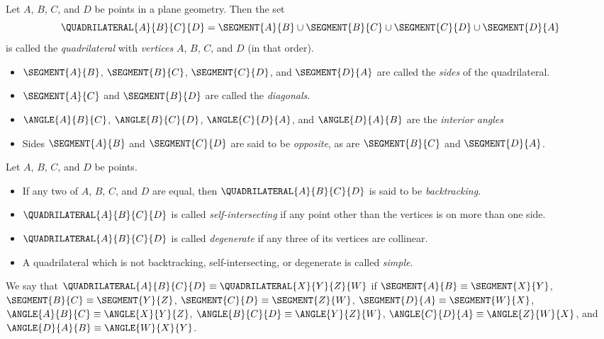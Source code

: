 \begin{dfn}[Quadrilateral]
Let \(A\), \(B\), \(C\), and \(D\) be points in a plane geometry.
Then the set \[ \QUADRILATERAL{A}{B}{C}{D} = \SEGMENT{A}{B} \cup \SEGMENT{B}{C} \cup \SEGMENT{C}{D} \cup \SEGMENT{D}{A} \] is called the \emph{quadrilateral} with \emph{vertices} \(A\), \(B\), \(C\), and \(D\) (in that order).
\begin{itemize}
\item \(\SEGMENT{A}{B}\), \(\SEGMENT{B}{C}\), \(\SEGMENT{C}{D}\), and \(\SEGMENT{D}{A}\) are called the \emph{sides} of the quadrilateral.
\item \(\SEGMENT{A}{C}\) and \(\SEGMENT{B}{D}\) are called the \emph{diagonals}.
\item \(\ANGLE{A}{B}{C}\), \(\ANGLE{B}{C}{D}\), \(\ANGLE{C}{D}{A}\), and \(\ANGLE{D}{A}{B}\) are the \emph{interior angles}
\item Sides \(\SEGMENT{A}{B}\) and \(\SEGMENT{C}{D}\) are said to be \emph{opposite}, as are \(\SEGMENT{B}{C}\) and \(\SEGMENT{D}{A}\).
\end{itemize}
\end{dfn}

\begin{dfn}
Let \(A\), \(B\), \(C\), and \(D\) be points.
\begin{itemize}
\item If any two of \(A\), \(B\), \(C\), and \(D\) are equal, then \(\QUADRILATERAL{A}{B}{C}{D}\) is said to be \emph{backtracking}.
\item \(\QUADRILATERAL{A}{B}{C}{D}\) is called \emph{self-intersecting} if any point other than the vertices is on more than one side.
\item \(\QUADRILATERAL{A}{B}{C}{D}\) is called \emph{degenerate} if any three of its vertices are collinear.
\item A quadrilateral which is not backtracking, self-intersecting, or degenerate is called \emph{simple}.
\end{itemize}
\end{dfn}

\begin{dfn}
We say that \(\QUADRILATERAL{A}{B}{C}{D} \equiv \QUADRILATERAL{X}{Y}{Z}{W}\) if \(\SEGMENT{A}{B} \equiv \SEGMENT{X}{Y}\), \(\SEGMENT{B}{C} \equiv \SEGMENT{Y}{Z}\), \(\SEGMENT{C}{D} \equiv \SEGMENT{Z}{W}\), \(\SEGMENT{D}{A} \equiv \SEGMENT{W}{X}\), \(\ANGLE{A}{B}{C} \equiv \ANGLE{X}{Y}{Z}\), \(\ANGLE{B}{C}{D} \equiv \ANGLE{Y}{Z}{W}\), \(\ANGLE{C}{D}{A} \equiv \ANGLE{Z}{W}{X}\), and \(\ANGLE{D}{A}{B} \equiv \ANGLE{W}{X}{Y}\).
\end{dfn}

